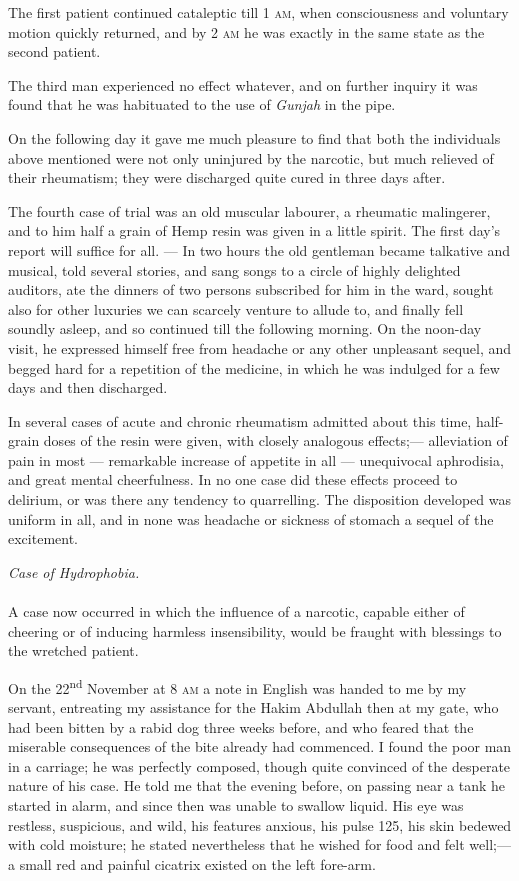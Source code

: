 \documentclass[a4paper, 11pt, oneside, polutonikogreek, english]{article}
\begin{document}
The first patient continued cataleptic till 1 \textsc{am}, when consciousness and voluntary motion quickly returned, and by 2 \textsc{am} he was exactly in the same state as the second patient.

The third man experienced no effect whatever, and on further inquiry it was found that he was habituated to the use of \emph{Gunjah} in the pipe.

On the following day it gave me much pleasure to find that both the individuals above mentioned were not only uninjured by the narcotic, but much relieved of their rheumatism; they were discharged quite cured in three days after.

The fourth case of trial was an old muscular labourer, a rheumatic malingerer, and to him half a grain of Hemp resin was given in a little spirit. The first day's report will suffice for all. --- In two hours the old gentleman became talkative and musical, told several stories, and sang songs to a circle of highly delighted auditors, ate the dinners of two persons subscribed for him in the ward, sought also for other luxuries we can scarcely venture to allude to, and finally fell soundly asleep, and so continued till the following morning. On the noon-day visit, he expressed himself free from headache or any other unpleasant sequel, and begged hard for a repetition of the medicine, in which he was indulged for a few days and then discharged.

In several cases of acute and chronic rheumatism admitted about this time, half-grain doses of the resin were given, with closely analogous effects;--- alleviation of pain in most --- remarkable increase of appetite in all --- unequivocal aphrodisia, and great mental cheerfulness. In no one case did these effects proceed to delirium, or was there any tendency to quarrelling. The disposition developed was uniform in all, and in none was headache or sickness of stomach a sequel of the excitement.
\begin{center}
\emph{Case of Hydrophobia.}
\end{center}
\paragraph{}
A case now occurred in which the influence of a narcotic, capable either of cheering or of inducing harmless insensibility, would be fraught with blessings to the wretched patient.

On the 22\textsuperscript{nd} November at 8 \textsc{am} a note in English was handed to me by my servant, entreating my assistance for the Hakim Abdullah then at my gate, who had been bitten by a rabid dog three weeks before, and who feared that the miserable consequences of the bite already had commenced. I found the poor man in a carriage; he was perfectly composed, though quite convinced of the desperate nature of his case. He told me that the evening before, on passing near a tank he started in alarm, and since then was unable to swallow liquid. His eye was restless, suspicious, and wild, his features anxious, his pulse 125, his skin bedewed with cold moisture; he stated nevertheless that he wished for food and felt well;--- a small red and painful cicatrix existed on the left fore-arm.
\end{document}
